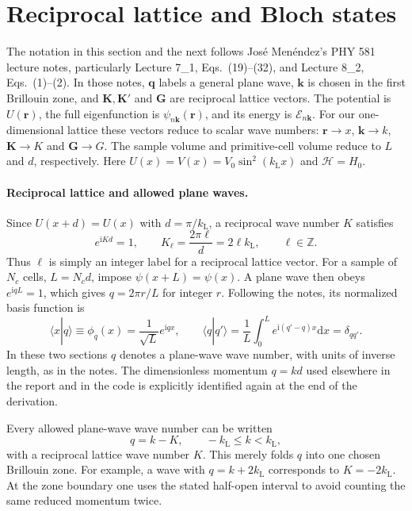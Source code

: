 \documentclass[11pt,oneside]{report}
\numberwithin{equation}{chapter}
\newcommand{\ii}{\mathrm i}
\newcommand{\dd}{\mathrm d}
\begin{document}
\section{Reciprocal lattice and Bloch states}
The notation in this section and the next follows Jos\'e Men\'endez's PHY 581 lecture notes, particularly Lecture 7\_1, Eqs.~(19)--(32), and Lecture 8\_2, Eqs.~(1)--(2). In those notes, $\bm q$ labels a general plane wave, $\bm k$ is chosen in the first Brillouin zone, and $\bm K,\bm K'$ and $\bm G$ are reciprocal lattice vectors. The potential is $U(\bm r)$, the full eigenfunction is $\psi_{n\bm k}(\bm r)$, and its energy is $\mathcal E_{n\bm k}$. For our one-dimensional lattice these vectors reduce to scalar wave numbers: $\bm r\to x$, $\bm k\to k$, $\bm K\to K$ and $\bm G\to G$. The sample volume and primitive-cell volume reduce to $L$ and $d$, respectively. Here $U(x)=V(x)=V_0\sin^2(k_{\mathrm L}x)$ and $\mathcal H=H_0$.

\paragraph{Reciprocal lattice and allowed plane waves.}
Since $U(x+d)=U(x)$ with $d=\pi/k_{\mathrm L}$, a reciprocal wave number $K$ satisfies
\begin{equation}
 e^{\ii Kd}=1,\qquad K_\ell=\frac{2\pi\ell}{d}=2\ell k_{\mathrm L},\qquad \ell\in\mathbb Z.
\end{equation}
Thus $\ell$ is simply an integer label for a reciprocal lattice vector. For a sample of $N_c$ cells, $L=N_cd$, impose $\psi(x+L)=\psi(x)$. A plane wave then obeys $e^{\ii qL}=1$, which gives $q=2\pi r/L$ for integer $r$. Following the notes, its normalized basis function is
\begin{equation}\label{eq:notesbasis}
 \langle x|q\rangle\equiv\phi_q(x)=\frac{1}{\sqrt L}e^{\ii qx},\qquad
 \langle q|q'\rangle=\frac1L\int_0^L e^{\ii(q'-q)x}\dd x=\delta_{qq'}.
\end{equation}
In these two sections $q$ denotes a plane-wave wave number, with units of inverse length, as in the notes. The dimensionless momentum $q=kd$ used elsewhere in the report and in the code is explicitly identified again at the end of the derivation.

Every allowed plane-wave wave number can be written
\begin{equation}\label{eq:notesdecomposition}
 q=k-K,\qquad -k_{\mathrm L}\leq k<k_{\mathrm L},
\end{equation}
with a reciprocal lattice wave number $K$. This merely folds $q$ into one chosen Brillouin zone. For example, a wave with $q=k+2k_{\mathrm L}$ corresponds to $K=-2k_{\mathrm L}$. At the zone boundary one uses the stated half-open interval to avoid counting the same reduced momentum twice.
\end{document}
